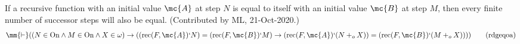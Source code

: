 \begin{lemma} If a recursive function with an initial
value $\mc{A}$ at step $N$ is
       equal to itself with an initial value $\mc{B}$ at step $M$, then every
       finite number of successor steps will also be equal.  (Contributed by
       ML, 21-Oct-2020.)
\begin{align}
\mm{\vdash} ( ( N \in {\rm On} \wedge M \in {\rm On} \wedge X \in {\rm \omega}
    ) \rightarrow ( ( {\rm rec} ( F , \mc{A} ) ` N ) = ( {\rm rec} ( F , \mc{B}
    ) ` M ) \rightarrow ( {\rm rec} ( F , \mc{A} ) ` ( N +_o X ) ) = ( {\rm
    rec} ( F , \mc{B} ) ` ( M +_o X ) ) ) )\label{eq:rdgeqoa}\tag{rdgeqoa}
\end{align}
\end{lemma}




